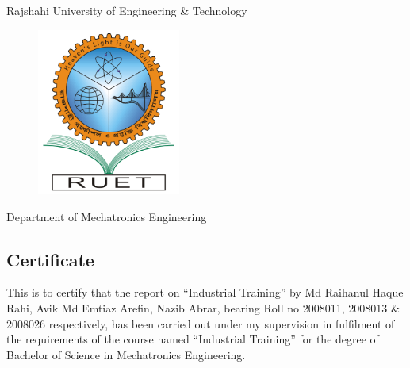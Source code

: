 \begin{center}
    Rajshahi University of Engineering \& Technology
\end{center}
\begin{figure}[h!]
    \centering
    \includegraphics[width=4.7cm]{figs/RUET.png}
    \label{fig:ruet2}
\end{figure}
\setlength{\columnsep}{0.1\textwidth}
\begin{center}
    Department of Mechatronics Engineering
    \subsection*{Certificate}
\end{center}

\noindent This is to certify that the report on “Industrial Training” by Md Raihanul Haque Rahi, Avik Md Emtiaz Arefin, Nazib Abrar, bearing Roll no 2008011, 2008013 \& 2008026 respectively, has been carried out under my supervision in fulfilment of the requirements of the course named “Industrial Training” for the degree of Bachelor of Science in Mechatronics Engineering.

